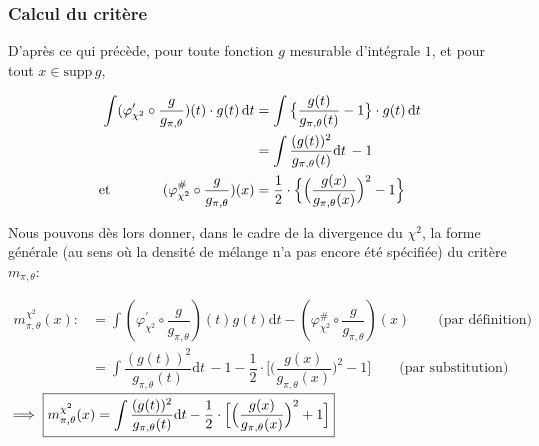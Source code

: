 \documentclass{article}
\begin{document}
    \subsubsection{Calcul du critère}

    D'après ce qui précède, pour toute fonction $g$ mesurable d'intégrale $1$, et pour tout $x\in\mathrm{supp}\,g$,

    \begin{align*}
        \int (\varphi'_{\chi^2}\circ\dfrac{g}{g_{\pi,\theta}})(t)\cdot{}g(t) \,\mathrm{d}t & = \int \big\{\dfrac{g(t)}{g_{\pi,\theta}(t)}-1\big\}\cdot{}g(t) \,\mathrm{d}t \\
                                                                                & = \int \dfrac{(g(t))^2}{g_{\pi,\theta}(t)}\mathrm{d}t\, - 1\\
        \mbox{et }\hspace*{1.2cm}(\varphi^\#_{\chi^2}\circ\dfrac{g}{g_{\pi,\theta}})(x) & =  \dfrac{1}{2}\cdot\Big\{ \Big(\dfrac{g(x)}{g_{\pi,\theta}(x)}\Big)^2 - 1 \Big\}                                                                     
    \end{align*}

    Nous pouvons dès lors donner, dans le cadre de la divergence du $\chi^2$, la forme générale (au sens où la densité de mélange n'a pas encore été spécifiée) du critère $m_{\pi,\theta}$:

    \begin{align*}
        m_{\pi,\theta}^{\chi^2}(x) :   &= \int(\varphi_{\chi^2}^\prime\circ\dfrac{g}{g_{\pi,\theta}})(t)g(t)\mathrm{d}t - (\varphi_{\chi^2}^\#\circ\dfrac{g}{g_{\pi,\theta}})(x) \qquad\mbox{(par définition)}\\
                            &= \int \dfrac{(g(t))^2}{g_{\pi,\theta}(t)}\mathrm{d}t\, - 1 -\dfrac{1}{2}\cdot\Big[ \Big(\dfrac{g(x)}{g_{\pi,\theta}(x)}\Big)^2 - 1\Big] \qquad \mbox{(par substitution)}
    \end{align*}
    \hspace{1.1cm}$\implies \fbox{$m_{\pi,\theta}^{\chi^2}(x) = \mathop{\mathlarger{\int}} \dfrac{(g(t))^2}{g_{\pi,\theta}(t)}\mathrm{d}t - \dfrac{1}{2}\cdot\Big[ \Big(\dfrac{g(x)}{g_{\pi,\theta}(x)}\Big)^2 + 1 \Big]$}$ \\
\end{document}
